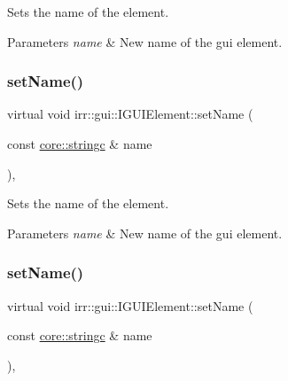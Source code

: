 Sets the name of the element. 


\begin{DoxyParams}{Parameters}
{\em name} & New name of the gui element. \\
\hline
\end{DoxyParams}
\mbox{\label{classirr_1_1gui_1_1IGUIElement_a5e318b47fece6d4157a1d7ccf401f1c8}} 
\subsubsection{\texorpdfstring{set\+Name()}{setName()}\hspace{0.1cm}{\footnotesize\ttfamily [3/4]}}
{\footnotesize\ttfamily virtual void irr\+::gui\+::\+I\+G\+U\+I\+Element\+::set\+Name (\begin{DoxyParamCaption}\item[{const \hyperlink{namespaceirr_1_1core_ab26a0e0359206b5a694f35c37c829d7f}{core\+::stringc} \&}]{name }\end{DoxyParamCaption})\hspace{0.3cm}{\ttfamily [inline]}, {\ttfamily [virtual]}}



Sets the name of the element. 


\begin{DoxyParams}{Parameters}
{\em name} & New name of the gui element. \\
\hline
\end{DoxyParams}
\mbox{\label{classirr_1_1gui_1_1IGUIElement_a5e318b47fece6d4157a1d7ccf401f1c8}} 
\subsubsection{\texorpdfstring{set\+Name()}{setName()}\hspace{0.1cm}{\footnotesize\ttfamily [4/4]}}
{\footnotesize\ttfamily virtual void irr\+::gui\+::\+I\+G\+U\+I\+Element\+::set\+Name (\begin{DoxyParamCaption}\item[{const \hyperlink{namespaceirr_1_1core_ab26a0e0359206b5a694f35c37c829d7f}{core\+::stringc} \&}]{name }\end{DoxyParamCaption})\hspace{0.3cm}{\ttfamily [inline]}, {\ttfamily [virtual]}}



